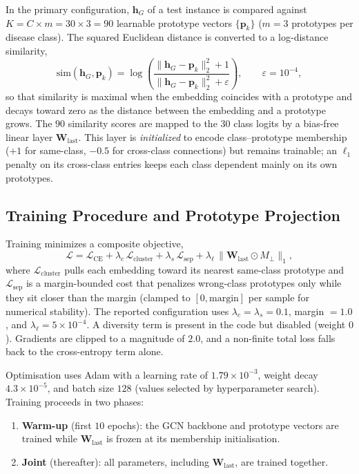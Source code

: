 In the primary configuration, $\mathbf{h}_G$ of a test instance is compared against
$K = C \times m = 30 \times 3 = 90$ learnable prototype vectors
$\{\mathbf{p}_k\}$ ($m = 3$ prototypes per disease class). The squared Euclidean
distance is converted to a log-distance similarity,
\[
  \mathrm{sim}(\mathbf{h}_G, \mathbf{p}_k)
  = \log\!\left(
      \frac{\lVert \mathbf{h}_G - \mathbf{p}_k\rVert_2^2 + 1}
           {\lVert \mathbf{h}_G - \mathbf{p}_k\rVert_2^2 + \varepsilon}
    \right), \qquad \varepsilon = 10^{-4},
\]
so that similarity is maximal when the embedding coincides with a prototype and
decays toward zero as the distance between the embedding and a prototype grows. The $90$ similarity scores are mapped
to the $30$ class logits by a bias-free linear layer
$\mathbf{W}_{\mathrm{last}}$. This layer is \emph{initialized} to encode
class--prototype membership ($+1$ for same-class, $-0.5$ for cross-class
connections) but remains trainable; an $\ell_1$ penalty on its cross-class
entries keeps each class dependent mainly on its own prototypes.

\subsection{Training Procedure and Prototype Projection}

Training minimizes a composite objective,
\[
  \mathcal{L} = \mathcal{L}_{\mathrm{CE}}
              + \lambda_c\,\mathcal{L}_{\mathrm{cluster}}
              + \lambda_s\,\mathcal{L}_{\mathrm{sep}}
              + \lambda_\ell\,\lVert \mathbf{W}_{\mathrm{last}}\odot M_\perp\rVert_1 ,
\]
where $\mathcal{L}_{\mathrm{cluster}}$ pulls each embedding toward its nearest
same-class prototype and $\mathcal{L}_{\mathrm{sep}}$ is a margin-bounded cost
that penalizes wrong-class prototypes only while they sit closer than the margin
(clamped to $[0,\text{margin}]$ per sample for numerical stability). The
reported configuration uses $\lambda_c = \lambda_s = 0.1$,
margin $= 1.0$, and $\lambda_\ell = 5\times 10^{-4}$. A diversity term is present in the code but
disabled (weight $0$). Gradients are clipped to a magnitude of $2.0$, and a
non-finite total loss falls back to the cross-entropy term alone.

Optimisation uses Adam with a learning rate of $1.79\times10^{-3}$, weight decay
$4.3\times10^{-5}$, and batch size $128$ (values selected by hyperparameter
search). Training proceeds in two phases:

\begin{enumerate}
  \item \textbf{Warm-up} (first $10$ epochs): the GCN backbone and prototype
        vectors are trained while $\mathbf{W}_{\mathrm{last}}$ is frozen at its
        membership initialisation.
  \item \textbf{Joint} (thereafter): all parameters, including
        $\mathbf{W}_{\mathrm{last}}$, are trained together.
\end{enumerate}

